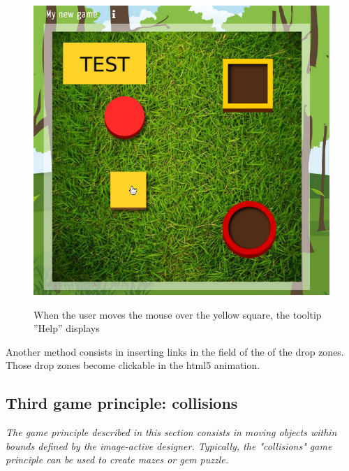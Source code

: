 \begin{figure}[htp]
 \centering
 \caption{When the user moves the mouse over the yellow square, the tooltip ''Help'' displays}
 \includegraphics[width=\textwidth]{images/tooltip_example}
 \label{tooltip_example}
\end{figure}

Another method consists in inserting links in the  field of the  
of the drop zones. Those drop zones become clickable in the html5 animation.

\subsection{Third game principle: collisions}

\textit{The game principle described in this section consists in moving objects
within bounds defined by the image-active designer. Typically, the "collisions" game principle
can be used to create mazes or gem puzzle.}




